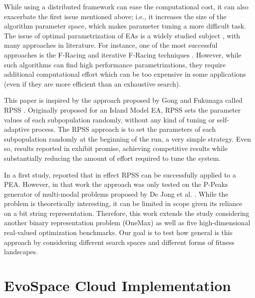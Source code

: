 \documentclass[conference]{IEEEtran}
\begin{document}
While using a distributed framework can ease the computational cost, it can also exacerbate the first issue mentioned above;
i.e., it increases the size of the algorithm parameter space, which makes parameter tuning a more difficult task.
The issue of optimal parametrization of EAs is a widely studied subject \cite{de2007parameter},
with many approaches in literature. For instance, one of the most successful approaches
is the F-Racing and iterative F-Racing techniques \cite{lopez2011irace}.
However, while such algorithms can find high performance parametrizations,
they require additional computational effort which can be too expensive in some applications
(even if they are more efficient than an exhaustive search).

This paper is inspired by the approach proposed by Gong and Fukunaga
called RPSS \cite{fuku1,fuku2}.
Originally proposed for an Island Model EA, RPSS sets the parameter values of each subpopulation randomly,
without any kind of tuning or self-adaptive process. The RPSS approach is to set the parameters
of each subpopulation randomly at the beginning of the run, a very simple strategy.
Even so, results reported in \cite{fuku1,fuku2} exhibit promise, achieving competitive results
while substantially reducing the amount of effort required to tune the system.

In a first study, \cite{garcia2014randomized} reported that in effect RPSS
can be successfully applied to a PEA. However, in that work the
approach was only tested on the P-Peaks generator of multi-modal problems proposed by De Jong et al. \cite{Jong:PS97}.
While the problem is theoretically interesting, it can be limited in scope given its reliance on a bit string representation.
Therefore, this work extends the study considering another binary representation problem (OneMax) as well as
five high-dimensional real-valued optimization benchmarks. Our goal is
to test how general is this approach by considering different search
spaces and different forms of fitness landscapes.


\section{EvoSpace Cloud Implementation}
\label{sec:evo}
\end{document}
